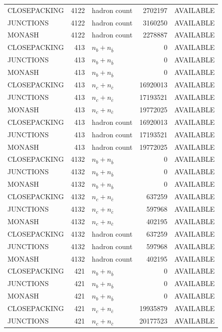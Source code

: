 \begin{landscape}
\begin{longtable}{@{}lrlrl@{}}
CLOSEPACKING & 4122 & hadron count & \num{2702197} & AVAILABLE \\
JUNCTIONS & 4122 & hadron count & \num{3160250} & AVAILABLE \\
MONASH & 4122 & hadron count & \num{2278887} & AVAILABLE \\
CLOSEPACKING & 413 & $n_b+n_{\bar b}$ & \num{0} & AVAILABLE \\
JUNCTIONS & 413 & $n_b+n_{\bar b}$ & \num{0} & AVAILABLE \\
MONASH & 413 & $n_b+n_{\bar b}$ & \num{0} & AVAILABLE \\
CLOSEPACKING & 413 & $n_c+n_{\bar c}$ & \num{16920013} & AVAILABLE \\
JUNCTIONS & 413 & $n_c+n_{\bar c}$ & \num{17193521} & AVAILABLE \\
MONASH & 413 & $n_c+n_{\bar c}$ & \num{19772025} & AVAILABLE \\
CLOSEPACKING & 413 & hadron count & \num{16920013} & AVAILABLE \\
JUNCTIONS & 413 & hadron count & \num{17193521} & AVAILABLE \\
MONASH & 413 & hadron count & \num{19772025} & AVAILABLE \\
CLOSEPACKING & 4132 & $n_b+n_{\bar b}$ & \num{0} & AVAILABLE \\
JUNCTIONS & 4132 & $n_b+n_{\bar b}$ & \num{0} & AVAILABLE \\
MONASH & 4132 & $n_b+n_{\bar b}$ & \num{0} & AVAILABLE \\
CLOSEPACKING & 4132 & $n_c+n_{\bar c}$ & \num{637259} & AVAILABLE \\
JUNCTIONS & 4132 & $n_c+n_{\bar c}$ & \num{597968} & AVAILABLE \\
MONASH & 4132 & $n_c+n_{\bar c}$ & \num{402195} & AVAILABLE \\
CLOSEPACKING & 4132 & hadron count & \num{637259} & AVAILABLE \\
JUNCTIONS & 4132 & hadron count & \num{597968} & AVAILABLE \\
MONASH & 4132 & hadron count & \num{402195} & AVAILABLE \\
CLOSEPACKING & 421 & $n_b+n_{\bar b}$ & \num{0} & AVAILABLE \\
JUNCTIONS & 421 & $n_b+n_{\bar b}$ & \num{0} & AVAILABLE \\
MONASH & 421 & $n_b+n_{\bar b}$ & \num{0} & AVAILABLE \\
CLOSEPACKING & 421 & $n_c+n_{\bar c}$ & \num{19935879} & AVAILABLE \\
JUNCTIONS & 421 & $n_c+n_{\bar c}$ & \num{20177523} & AVAILABLE \\

\end{longtable}
\end{landscape}
